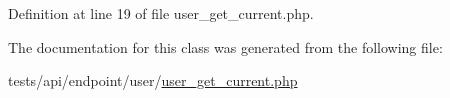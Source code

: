 Definition at line 19 of file user\+\_\+get\+\_\+current.\+php.



The documentation for this class was generated from the following file\+:\begin{DoxyCompactItemize}
\item 
tests/api/endpoint/user/\hyperlink{tests_2api_2endpoint_2user_2user__get__current_8php}{user\+\_\+get\+\_\+current.\+php}\end{DoxyCompactItemize}

